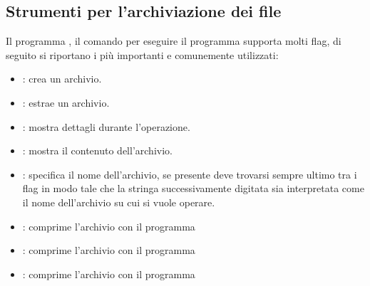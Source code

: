 \subsection{Strumenti per l'archiviazione dei file}
\label{subsec:Strumenti-per-l'archiviazione-dei-file}
Il programma , il comando per eseguire il programma supporta molti flag, di seguito si riportano i più importanti e comunemente utilizzati:
\begin{itemize}
    \item {}: crea un archivio.
    \item {}: estrae un archivio.
    \item {}: mostra dettagli durante l'operazione.
    \item {}: mostra il contenuto dell'archivio.
    \item {}: specifica il nome dell'archivio, se presente deve trovarsi sempre ultimo tra i flag in modo tale che la stringa successivamente digitata sia interpretata come il nome dell'archivio su cui si vuole operare.
    \item {}: comprime l'archivio con il programma 
    \item {}: comprime l'archivio con il programma 
    \item {}: comprime l'archivio con il programma 
\end{itemize}
